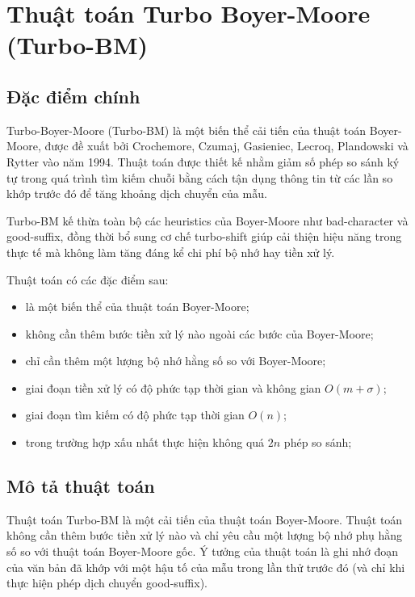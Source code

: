 \section{Thuật toán Turbo Boyer-Moore (Turbo-BM)}

\subsection{Đặc điểm chính}

Turbo-Boyer-Moore (Turbo-BM) là một biến thể cải tiến của thuật toán Boyer-Moore, được đề xuất bởi Crochemore, Czumaj, Gasieniec, Lecroq, Plandowski và Rytter vào năm 1994. Thuật toán được thiết kế nhằm giảm số phép so sánh ký tự trong quá trình tìm kiếm chuỗi bằng cách tận dụng thông tin từ các lần so khớp trước đó để tăng khoảng dịch chuyển của mẫu.

Turbo-BM kế thừa toàn bộ các heuristics của Boyer-Moore như bad-character và good-suffix, đồng thời bổ sung cơ chế turbo-shift giúp cải thiện hiệu năng trong thực tế mà không làm tăng đáng kể chi phí bộ nhớ hay tiền xử lý.

Thuật toán có các đặc điểm sau:

\begin{itemize}
    \item là một biến thể của thuật toán Boyer-Moore;
    \item không cần thêm bước tiền xử lý nào ngoài các bước của Boyer-Moore;
    \item chỉ cần thêm một lượng bộ nhớ hằng số so với Boyer-Moore;
    \item giai đoạn tiền xử lý có độ phức tạp thời gian và không gian $O(m + \sigma)$;
    \item giai đoạn tìm kiếm có độ phức tạp thời gian $O(n)$;
    \item trong trường hợp xấu nhất thực hiện không quá $2n$ phép so sánh;
\end{itemize}

\subsection{Mô tả thuật toán}

Thuật toán Turbo-BM là một cải tiến của thuật toán Boyer-Moore. Thuật toán không cần thêm bước tiền xử lý nào và chỉ yêu cầu một lượng bộ nhớ phụ hằng số so với thuật toán Boyer-Moore gốc. Ý tưởng của thuật toán là ghi nhớ đoạn của văn bản đã khớp với một hậu tố của mẫu trong lần thử trước đó (và chỉ khi thực hiện phép dịch chuyển good-suffix).


